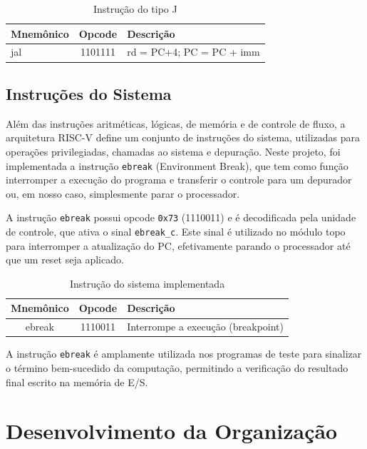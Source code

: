 \documentclass[
	12pt,				%
	oneside,
	a4paper,			%
	english,			%
	french,				%
	spanish,			%
	brazil,				%
	]{abntex2}
\begin{document}
\begin{table}[H]
\centering
\caption{Instrução do tipo J}
\label{tab:JType}
\begin{tabular}{|l|c|l|}
\hline
Mnemônico & Opcode & Descrição \\ \hline
jal & 1101111 & rd = PC+4; PC = PC + imm \\ \hline
\end{tabular}
\end{table}

\subsection{Instruções do Sistema}

Além das instruções aritméticas, lógicas, de memória e de controle de fluxo, a arquitetura RISC-V define um conjunto de instruções do sistema, utilizadas para operações privilegiadas, chamadas ao sistema e depuração. Neste projeto, foi implementada a instrução \texttt{ebreak} (Environment Break), que tem como função interromper a execução do programa e transferir o controle para um depurador ou, em nosso caso, simplesmente parar o processador.

A instrução \texttt{ebreak} possui opcode \texttt{0x73} (1110011) e é decodificada pela unidade de controle, que ativa o sinal \texttt{ebreak\_c}. Este sinal é utilizado no módulo topo para interromper a atualização do PC, efetivamente parando o processador até que um reset seja aplicado.

\begin{table}[H]
\centering
\caption{Instrução do sistema implementada}
\label{tab:system_instr}
\begin{tabular}{|c|c|l|}
\hline
Mnemônico & Opcode & Descrição \\ \hline
ebreak & 1110011 & Interrompe a execução (breakpoint) \\ \hline
\end{tabular}
\end{table}

A instrução \texttt{ebreak} é amplamente utilizada nos programas de teste para sinalizar o término bem-sucedido da computação, permitindo a verificação do resultado final escrito na memória de E/S.

\section{Desenvolvimento da Organização}
\end{document}
